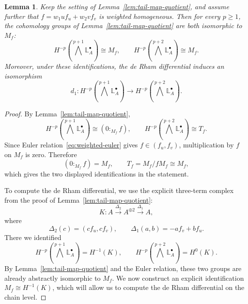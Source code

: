 \documentclass[10pt,a4paper]{amsart}
\newtheorem{lemma}{Lemma}
\renewcommand{\ge}{\geqslant}
\begin{document}
\begin{lemma}\label{lem:tail-map-euler}
Keep the setting of Lemma~\ref{lem:tail-map-quotient}, and assume further that \(f=w_1u f_u+w_2v f_v\) is weighted homogeneous. Then for every $p\ge 1$, the cohomology groups of Lemma~\ref{lem:tail-map-quotient} are both isomorphic to \(M_f\):
\[
H^{-p}\!\left(\bigwedge^{p+1}\mathbb{L}^{\bullet}_A\right)\cong M_f,
\qquad
H^{-p}\!\left(\bigwedge^{p+2}\mathbb{L}^{\bullet}_A\right)\cong M_f.
\]
Moreover, under these identifications, the de Rham differential induces an isomorphism
\[
d_1:
H^{-p}\!\left(\bigwedge^{p+1}\mathbb{L}^{\bullet}_A\right)
\longrightarrow
H^{-p}\!\left(\bigwedge^{p+2}\mathbb{L}^{\bullet}_A\right).
\]
\end{lemma}

\begin{proof}
By Lemma~\ref{lem:tail-map-quotient},
\[
H^{-p}\!\left(\bigwedge^{p+1}\mathbb{L}^{\bullet}_A\right)\cong (0:_{M_f}f),
\qquad
H^{-p}\!\left(\bigwedge^{p+2}\mathbb{L}^{\bullet}_A\right)\cong T_f.
\]
Since Euler relation~\eqref{eq:weighted-euler} gives \(f\in (f_u,f_v)\), multiplication by \(f\) on \(M_f\) is zero. Therefore
\[
(0:_{M_f}f)=M_f,
\qquad
T_f=M_f/fM_f\cong M_f,
\]
which gives the two displayed identifications in the statement.

To compute the de Rham differential, we use the explicit three-term complex from the proof of Lemma~\ref{lem:tail-map-quotient}:
\[
K:
A \xrightarrow{\Delta_2} A^{\oplus 2}\xrightarrow{\Delta_1} A,
\]
where
\[
\Delta_2(c)=(cf_u,cf_v),\qquad \Delta_1(a,b)=-af_v+bf_u.
\]
There we identified
\[
H^{-p}\!\left(\bigwedge^{p+1}\mathbb{L}^{\bullet}_A\right)=H^{-1}(K),
\qquad
H^{-p}\!\left(\bigwedge^{p+2}\mathbb{L}^{\bullet}_A\right)=H^{0}(K).
\]
By Lemma~\ref{lem:tail-map-quotient} and the Euler relation, these two groups are already abstractly isomorphic to \(M_f\). We now construct an explicit identification \(M_f\cong H^{-1}(K)\), which will allow us to compute the de Rham differential on the chain level.


\end{proof}
\end{document}
